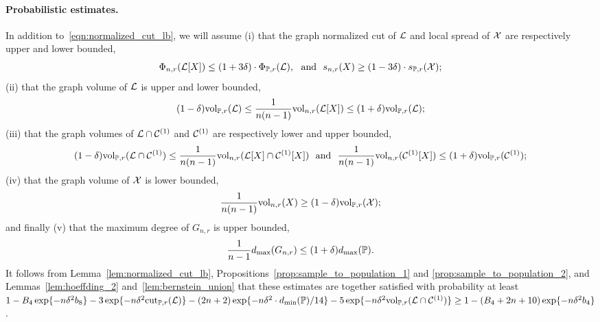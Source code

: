 \paragraph{Probabilistic estimates.}
In addition to~\eqref{eqn:normalized_cut_lb}, we will assume (i) that the graph normalized cut of $\mathcal{L}$ and local spread of $\mathcal{X}$ are respectively upper and lower bounded,
\begin{equation*}
\Phi_{n,r}(\mathcal{L}[X]) \leq (1 + 3\delta) \cdot \Phi_{\mathbb{P},r}(\mathcal{L}),~~\textrm{and}~~s_{n,r}(X) \geq (1 - 3\delta) \cdot s_{\mathbb{P},r}(\mathcal{X});
\end{equation*}
(ii) that the graph volume of $\mathcal{L}$ is upper and lower bounded,
\begin{equation*}
(1 - \delta) \mathrm{vol}_{\mathbb{P},r}(\mathcal{L}) \leq \frac{1}{n(n - 1)}\mathrm{vol}_{n,r}(\mathcal{L}[X]) \leq (1 + \delta) \mathrm{vol}_{\mathbb{P},r}(\mathcal{L});
\end{equation*}
(iii) that the graph volumes of $\mathcal{L} \cap \mathcal{C}^{(1)}$ and $\mathcal{C}^{(1)}$ are respectively lower and upper bounded,
\begin{equation}
(1 - \delta) \mathrm{vol}_{\mathbb{P},r}(\mathcal{L} \cap \mathcal{C}^{(1)}) \leq \frac{1}{n(n - 1)}\mathrm{vol}_{n,r}({\mathcal{L}[X] \cap \mathcal{C}^{(1)}}[X])~~\textrm{and}~~\frac{1}{n(n - 1)}\mathrm{vol}_{n,r}(\mathcal{C}^{(1)}[X]) \leq (1 + \delta) \mathrm{vol}_{\mathbb{P},r}(\mathcal{C}^{(1)});
\end{equation}
(iv) that the graph volume of $\mathcal{X}$ is lower bounded,
\begin{equation*}
\frac{1}{n(n - 1)}\mathrm{vol}_{n,r}(X) \geq (1 - \delta) \mathrm{vol}_{\mathbb{P},r}(\mathcal{X});
\end{equation*}
and finally (v) that the maximum degree of $G_{n,r}$ is upper bounded,
\begin{equation*}
\frac{1}{n - 1}d_{\max}(G_{n,r}) \leq (1 + \delta) d_{\max}(\mathbb{P}).
\end{equation*}
It follows from Lemma~\ref{lem:normalized_cut_lb}, Propositions~\ref{prop:sample_to_population_1} and \ref{prop:sample_to_population_2}, and Lemmas~\ref{lem:hoeffding_2} and~\ref{lem:bernstein_union} that these estimates are together satisfied with probability at least $1 - B_4\exp\{-n\delta^2b_8\} - 3\exp\{-n\delta^2 \mathrm{cut}_{\mathbb{P},r}(\mathcal{L})\} - (2n + 2)\exp\{-n\delta^2 \cdot d_{\min}(\mathbb{P})/14\} - 5\exp\{-n\delta^2 \mathrm{vol}_{\mathbb{P},r}(\mathcal{L} \cap \mathcal{C}^{(1)})\} \geq 1 - (B_4 + 2n + 10)\exp\{-n\delta^2 b_4\}$. 

